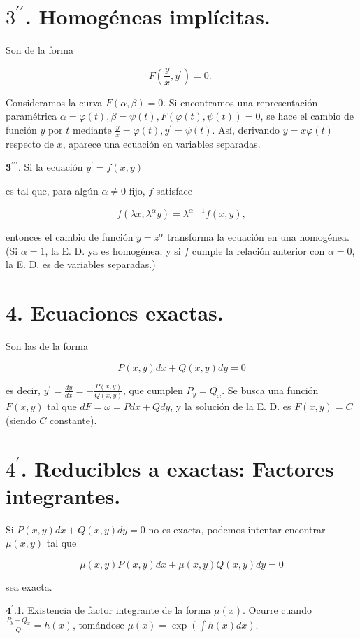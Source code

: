 \documentclass[10pt]{article}
\begin{document}
\section*{$3^{\prime \prime}$. Homogéneas implícitas.}
Son de la forma

$$
F\left(\frac{y}{x}, y^{\prime}\right)=0 \text {. }
$$

Consideramos la curva $F(\alpha, \beta)=0$. Si encontramos una representación paramétrica $\alpha=\varphi(t), \beta=\psi(t), F(\varphi(t), \psi(t))=0$, se hace el cambio de función $y$ por $t$ mediante $\frac{y}{x}=\varphi(t), y^{\prime}=\psi(t)$. Así, derivando $y=x \varphi(t)$ respecto de $x$, aparece una ecuación en variables separadas.

$\mathbf{3}^{\prime \prime \prime}$. Si la ecuación $y^{\prime}=f(x, y)$

es tal que, para algún $\alpha \neq 0$ fijo, $f$ satisface

$$
f\left(\lambda x, \lambda^{\alpha} y\right)=\lambda^{\alpha-1} f(x, y),
$$

entonces el cambio de función $y=z^{\alpha}$ transforma la ecuación en una homogénea. (Si $\alpha=1$, la E. D. ya es homogénea; y si $f$ cumple la relación anterior con $\alpha=0$, la E. D. es de variables separadas.)

\section*{4. Ecuaciones exactas.}
Son las de la forma

$$
P(x, y) d x+Q(x, y) d y=0
$$

es decir, $y^{\prime}=\frac{d y}{d x}=-\frac{P(x, y)}{Q(x, y)}$, que cumplen $P_{y}=Q_{x}$. Se busca una función $F(x, y)$ tal que $d F=\omega=P d x+Q d y$, y la solución de la E. D. es $F(x, y)=C$ (siendo $C$ constante).

\section*{$4^{\prime}$. Reducibles a exactas: Factores integrantes.}
Si $P(x, y) d x+Q(x, y) d y=0$ no es exacta, podemos intentar encontrar $\mu(x, y)$ tal que

$$
\mu(x, y) P(x, y) d x+\mu(x, y) Q(x, y) d y=0
$$

sea exacta.

$\mathbf{4}^{\prime}$.1. Existencia de factor integrante de la forma $\mu(x)$. Ocurre cuando $\frac{P_{y}-Q_{x}}{Q}=h(x)$, tomándose $\mu(x)=\exp \left(\int h(x) d x\right)$.
\end{document}
